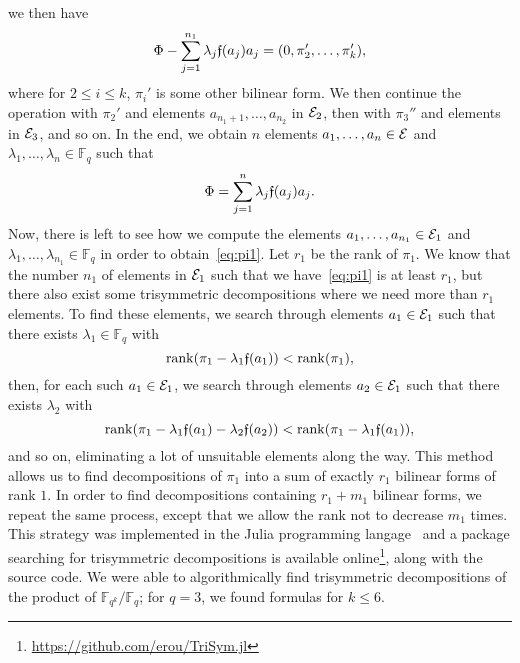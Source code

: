 \documentclass[11pt]{article}
\begin{document}
we then have
\[
  \Phi-\sum_{j=1}^{n_1}\lambda_j\mathfrak{f}(a_j)a_j = (0, \pi_2', \dots, \pi_k'), 
\]
where for $2\leq i \leq k$, $\pi_i'$ is some other bilinear form.
We then continue the operation with $\pi_2'$ and elements $a_{n_1+1}, \dots,
a_{n_2}$ in $\mathcal{E}_2$, then with $\pi_3''$ and elements in $\mathcal{E}_3$, and so on. In
the end, we obtain $n$ elements $a_1, \dots, a_n\in \mathcal{E}$ and $\lambda_1, \dots,
\lambda_n\in\mathbb{F}_q$ such that
\[
  \Phi = \sum_{j=1}^{n}\lambda_j\mathfrak{f}(a_j)a_j.
\]
Now, there is left to see how we compute the elements $a_1, \dots,
a_{n_1}\in\mathcal{E}_1$ and $\lambda_1, \dots, \lambda_{n_1}\in\mathbb{F}_q$ in order to
obtain~\eqref{eq:pi1}. Let $r_1$ be the rank of $\pi_1$. We know that the number
$n_1$ of elements in $\mathcal{E}_1$ such that we have~\eqref{eq:pi1} is at least $r_1$,
but there also exist some trisymmetric decompositions where we need more than $r_1$
elements. To find these elements, we search through elements $a_1\in\mathcal{E}_1$ such that
there exists $\lambda_1\in\mathbb{F}_q$ with
\[
  \operatorname{rank}(\pi_1-\lambda_1\mathfrak{f}(a_1))<\operatorname{rank}(\pi_1),
\]
then, for each such $a_1\in\mathcal{E}_1$, we search through elements $a_2\in\mathcal{E}_1$ such that there exists $\lambda_2$
with
\[
  \operatorname{rank}(\pi_1-\lambda_1\mathfrak{f}(a_1)-\lambda_2\mathfrak{f}(a_2))<\operatorname{rank}(\pi_1-\lambda_1\mathfrak{f}(a_1)),
\]
and so on, eliminating a lot of unsuitable elements along the way. This method
allows us to find decompositions of $\pi_1$ into a sum of exactly $r_1$ bilinear forms of
rank $1$. In order to find decompositions containing $r_1+m_1$ bilinear forms, we
repeat the same process, except that we allow the rank not to decrease $m_1$
times. This strategy was implemented in the Julia programming
langage~\cite{Julia} and a package searching for trisymmetric decompositions is
available online\footnote{\url{https://github.com/erou/TriSym.jl}}, along with
the source code. We were able to algorithmically find trisymmetric decompositions of the
product of $\mathbb{F}_{q^k}/\mathbb{F}_q$; for $q=3$, we found
formulas for $k\leq 6$.
\end{document}
